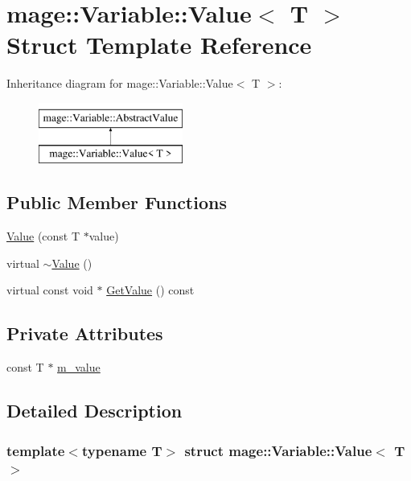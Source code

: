 \hypertarget{structmage_1_1_variable_1_1_value}{}\section{mage\+:\+:Variable\+:\+:Value$<$ T $>$ Struct Template Reference}
\label{structmage_1_1_variable_1_1_value}
Inheritance diagram for mage\+:\+:Variable\+:\+:Value$<$ T $>$\+:\begin{figure}[H]
\begin{center}
\leavevmode
\includegraphics[height=2.000000cm]{structmage_1_1_variable_1_1_value}
\end{center}
\end{figure}
\subsection*{Public Member Functions}
\begin{DoxyCompactItemize}
\item 
\hyperlink{structmage_1_1_variable_1_1_value_a1e29cc5eaeb8356a11a1eca0232cf162}{Value} (const T $\ast$value)
\item 
virtual \hyperlink{structmage_1_1_variable_1_1_value_ab0b88d59c1049b89557fbaf649a3b459}{$\sim$\+Value} ()
\item 
virtual const void $\ast$ \hyperlink{structmage_1_1_variable_1_1_value_afd0b93364cba9a55182f126fdcc79b50}{Get\+Value} () const
\end{DoxyCompactItemize}
\subsection*{Private Attributes}
\begin{DoxyCompactItemize}
\item 
const T $\ast$ \hyperlink{structmage_1_1_variable_1_1_value_aa15243b8811b108a0c7bff05456e377c}{m\+\_\+value}
\end{DoxyCompactItemize}


\subsection{Detailed Description}
\subsubsection*{template$<$typename T$>$\newline
struct mage\+::\+Variable\+::\+Value$<$ T $>$}

